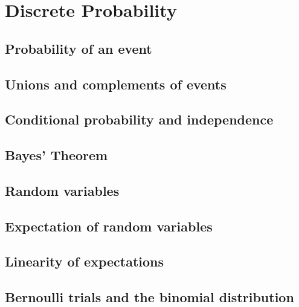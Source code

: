 \section{Discrete Probability}
\subsection{Probability of an event}
\subsection{Unions and complements of events}
\subsection{Conditional probability and independence}
\subsection{Bayes' Theorem}
\subsection{Random variables}
\subsection{Expectation of random variables}
\subsection{Linearity of expectations}
\subsection{Bernoulli trials and the binomial distribution}